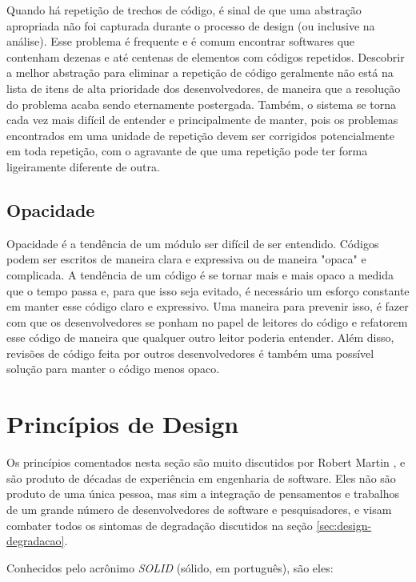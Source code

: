 Quando há repetição de trechos de código, é sinal de que uma abstração apropriada não foi capturada durante o processo de design (ou inclusive na análise).
Esse problema é frequente e é comum encontrar softwares que contenham dezenas e até centenas de elementos com códigos repetidos. Descobrir a melhor abstração para eliminar a repetição de código geralmente não está na lista de itens de alta prioridade dos desenvolvedores, de maneira que a resolução do problema acaba sendo eternamente postergada. Também, o sistema se torna cada vez mais difícil de entender e principalmente de manter, pois os problemas encontrados em uma unidade de repetição devem ser corrigidos potencialmente em toda repetição, com o agravante de que uma repetição pode ter forma ligeiramente diferente de outra.

\subsection{Opacidade}

Opacidade é a tendência de um módulo ser difícil de ser entendido. Códigos podem ser escritos de maneira clara e expressiva ou de maneira "opaca" e complicada.
A tendência de um código é se tornar mais e mais opaco a medida que o tempo passa e, para que isso seja evitado, é necessário um esforço constante em 
manter esse código claro e expressivo. Uma maneira para prevenir isso, é fazer com que os desenvolvedores se ponham no papel de leitores do código e
refatorem esse código de maneira que qualquer outro leitor poderia entender. Além disso, revisões de código feita por outros desenvolvedores é também
uma possível solução para manter o código menos opaco.


\section{Princípios de Design}
\label{sec:design-oo-principios}

Os princípios comentados nesta seção são muito discutidos por Robert Martin \cite{bob-martin}, e são produto de 
décadas de experiência em engenharia de software.
Eles não são produto de uma única pessoa, mas sim a integração de pensamentos e trabalhos de um grande número de
desenvolvedores de software e pesquisadores, e visam combater todos os sintomas de degradação discutidos na seção \ref{sec:design-degradacao}.

Conhecidos pelo acrônimo \textit{SOLID} (sólido, em português), são eles:


